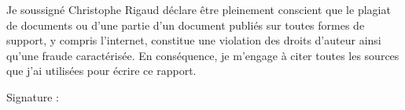 \documentclass[final,12pt]{report} 						%
\begin{document}
	\renewcommand{\labelitemi}{$\bullet$}
	\renewcommand{\appendixtocname}{Annexes}
	\setcounter{tocdepth}{4}

	\maketitle
	\newpage
	\vspace*{\fill}
	\hspace{1em}Je soussigné Christophe Rigaud déclare être pleinement conscient que le plagiat de documents ou
d’une partie d’un document publiés sur toutes formes de support, y compris l’internet, constitue une violation
des droits d’auteur ainsi qu’une fraude caractérisée. 
En conséquence, je m’engage à citer toutes les sources
que j’ai utilisées pour écrire ce rapport.\vspace{1em}

Signature :

	\thispagestyle{empty}
	\newpage	
%	
	 
	\thispagestyle{empty} 								%
	\tableofcontents 									%
	\thispagestyle{empty} 								%
	\setcounter{page}{0} 								%
	
	
	
	
	
	\pagestyle{empty} 									%
	\renewcommand{\appendixpagename}{Annexes}
	\appendix
	\appendixpage
	
	
	
	
	
	\printglossary[type=main,title={Glossary},toctitle={Glossary}]
	\thispagestyle{empty}\cleardoublepage

	\thispagestyle{empty}\cleardoublepage
\end{document}
